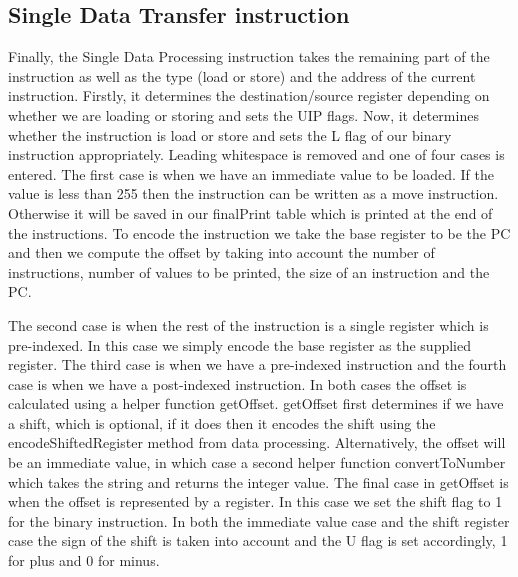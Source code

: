 \documentclass[11pt]{article}
\begin{document}
\subsection{Single Data Transfer instruction}
Finally, the Single Data Processing instruction takes the remaining part of the instruction as well as the type (load or store) and the address of the current instruction. Firstly, it determines the destination/source register depending on whether we are loading or storing and sets the UIP flags. Now, it determines whether the instruction is load or store and sets the L flag of our binary instruction appropriately. Leading whitespace is removed and one of four cases is entered. The first case is when we have an immediate value to be loaded. If the value is less than 255 then the instruction can be written as a move instruction. Otherwise it will be saved in our finalPrint table which is printed at the end of the instructions. To encode the instruction we take the base register to be the PC and then we compute the offset by taking into account the number of instructions, number of values to be printed, the size of an instruction and the PC. \par
The second case is when the rest of the instruction is a single register which is pre-indexed. In this case we simply encode the base register as the supplied register. The third case is when we have a pre-indexed instruction and the fourth case is when we have a post-indexed instruction. In both cases the offset is calculated using a helper function getOffset. getOffset first determines if we have a shift, which is optional, if it does then it encodes the shift using the encodeShiftedRegister method from data processing. Alternatively, the offset will be an immediate value, in which case a second helper function convertToNumber which takes the string and returns the integer value. The final case in getOffset is when the offset is represented by a register. In this case we set the shift flag to 1 for the binary instruction. In both the immediate value case and the shift register case the sign of the shift is taken into account and the U flag is set accordingly, 1 for plus and 0 for minus.
\end{document}
